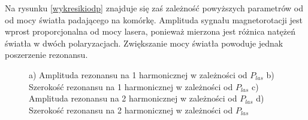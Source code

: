 \documentclass[a4paper,10pt,twoside]{article}
\begin{document}
Na rysunku \ref{wykresikiodp} znajduje się zaś zależność powyższych parametrów od od mocy światła padającego na komórkę. Amplituda sygnału magnetorotacji jest wprost proporcjonalna od mocy lasera, ponieważ mierzona jest różnica natężeń światła w dwóch polaryzacjach. Zwiększanie mocy światła powoduje jednak poszerzenie rezonansu.


\begin{figure}[h!]
\centering
{}

\caption{ a) Amplituda rezonansu na 1 harmonicznej w zależności od $P_{las}$ b) Szerokość rezonansu na 1 harmonicznej w zależności od $P_{las}$ 
c) Amplituda rezonansu na 2 harmonicznej w zależności od $P_{las}$ d) Szerokość rezonansu na 2 harmonicznej w zależności od $P_{las}$}
\label{wykresikiodP}
\end{figure}
\end{document}
